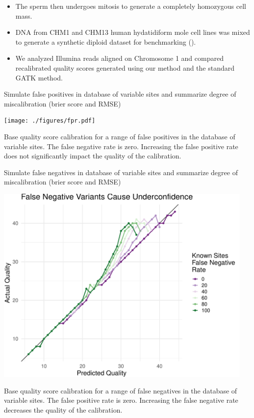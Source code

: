 \documentclass{article}
\begin{document}
\begin{outline}
\begin{itemize}
		\item The sperm then undergoes mitosis to generate a completely homozygous cell mass.
		\item DNA from CHM1 and CHM13 human hydatidiform mole cell lines was mixed to generate a synthetic diploid dataset for benchmarking (\cite{li_synthetic-diploid_2018}).
		\item We analyzed Illumina reads aligned on Chromosome 1 and compared recalibrated quality scores generated using our method and the standard GATK method.
	\end{itemize}
	\item Simulate false positives in database of variable sites and summarize degree of miscalibration (brier score and RMSE)
	\begin{outline}
		\item \texttt{[image: ./figures/fpr.pdf]}
		\item Base quality score calibration for a range of false positives in the database of variable sites. The false negative rate is zero. Increasing the false positive rate does not significantly impact the quality of the calibration.
	\end{outline}
	\item Simulate false negatives in database of variable sites and summarize degree of miscalibration (brier score and RMSE)
	\begin{outline}
		\item \includegraphics[width=5in]{./figures/fnr.pdf}
		\item Base quality score calibration for a range of false negatives in the database of variable sites. The false positive rate is zero. Increasing the false negative rate decreases the quality of the calibration.

\end{outline}
\end{outline}
\end{document}
